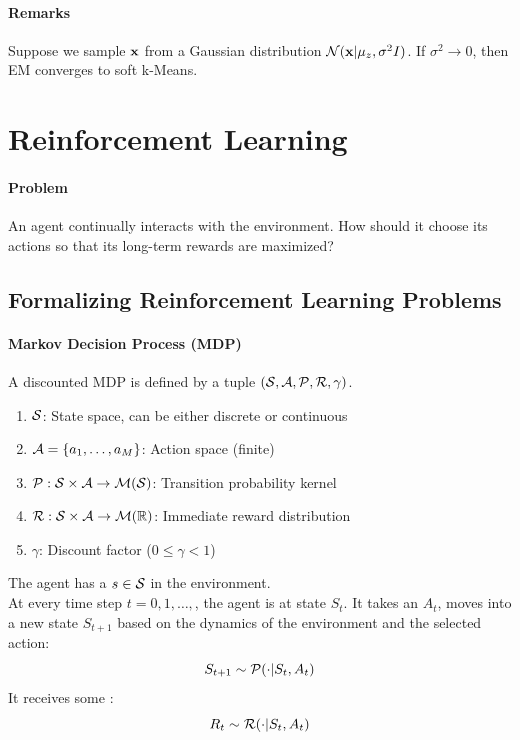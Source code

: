 \documentclass[11pt]{article}
\begin{document}
\paragraph{Remarks}
Suppose we sample $\textbf{x}$ from a Gaussian distribution $\mathcal{N}(\textbf{x}|\mu_z, \sigma^2I)$. If $\sigma^2 \rightarrow 0$, then EM converges to soft k-Means. 

\section{Reinforcement Learning}

\paragraph{Problem}
An agent continually interacts with the environment. How should it choose its actions so that its long-term rewards are maximized?

\subsection{Formalizing Reinforcement Learning Problems}
\paragraph{Markov Decision Process (MDP)}
A discounted MDP is defined by a tuple $(\mathcal{S,A,P,R},\gamma)$.\\
\begin{enumerate}
	\item $\mathcal{S}$: State space, can be either discrete or continuous
	\item $\mathcal{A} = \{a_1, \hdots, a_M\}$: Action space (finite)
	\item $\mathcal{P}:  \mathcal{S} \times \mathcal{A} \rightarrow \mathcal{M}(\mathcal{S})$: Transition probability kernel
	\item $\mathcal{R}: \mathcal{S} \times \mathcal{A} \rightarrow \mathcal{M}(\mathbb{R})$: Immediate reward distribution
	\item $\gamma$: Discount factor ($0 \leq \gamma < 1$)
\end{enumerate}
The agent has a  $s\in \mathcal{S}$ in the environment. \\
At every time step $t = 0, 1, \hdots,$, the agent is at state $S_t$. It takes an  $A_t$, moves into a new state $S_{t+1}$ based on the dynamics of the environment and the selected action:$$S_{t+1} \sim \mathcal{P}(\cdot|S_t, A_t)$$ 
It receives some : $$R_t \sim \mathcal{R}(\cdot|S_t, A_t)$$
\end{document}
